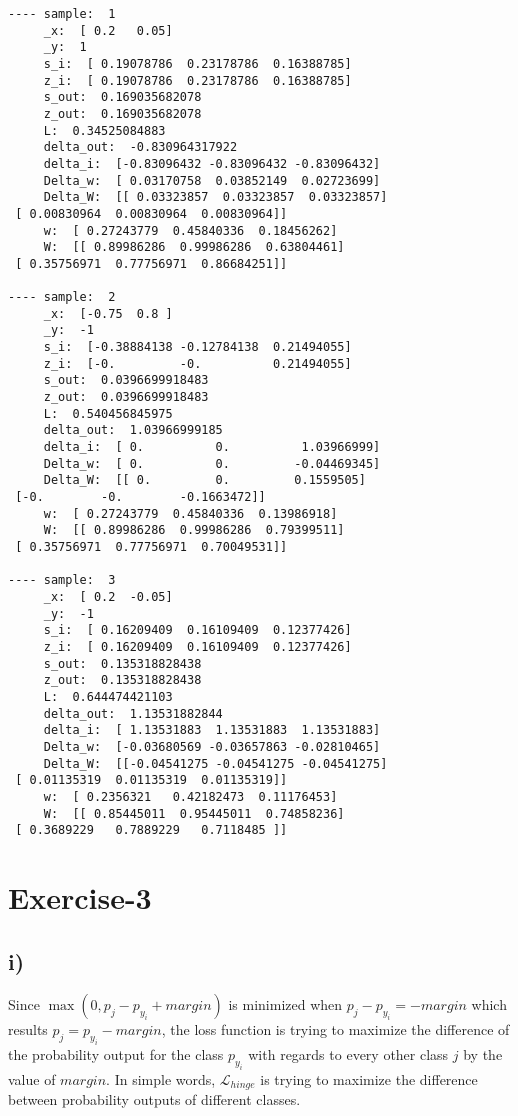 \documentclass[10pt]{article}
\begin{document}
\begin{multicols}{3}
\begin{tiny}
\begin{verbatim}
---- sample:  1
     _x:  [ 0.2   0.05]
     _y:  1
     s_i:  [ 0.19078786  0.23178786  0.16388785]
     z_i:  [ 0.19078786  0.23178786  0.16388785]
     s_out:  0.169035682078
     z_out:  0.169035682078
     L:  0.34525084883
     delta_out:  -0.830964317922
     delta_i:  [-0.83096432 -0.83096432 -0.83096432]
     Delta_w:  [ 0.03170758  0.03852149  0.02723699]
     Delta_W:  [[ 0.03323857  0.03323857  0.03323857]
 [ 0.00830964  0.00830964  0.00830964]]
     w:  [ 0.27243779  0.45840336  0.18456262]
     W:  [[ 0.89986286  0.99986286  0.63804461]
 [ 0.35756971  0.77756971  0.86684251]]

---- sample:  2
     _x:  [-0.75  0.8 ]
     _y:  -1
     s_i:  [-0.38884138 -0.12784138  0.21494055]
     z_i:  [-0.         -0.          0.21494055]
     s_out:  0.0396699918483
     z_out:  0.0396699918483
     L:  0.540456845975
     delta_out:  1.03966999185
     delta_i:  [ 0.          0.          1.03966999]
     Delta_w:  [ 0.          0.         -0.04469345]
     Delta_W:  [[ 0.         0.         0.1559505]
 [-0.        -0.        -0.1663472]]
     w:  [ 0.27243779  0.45840336  0.13986918]
     W:  [[ 0.89986286  0.99986286  0.79399511]
 [ 0.35756971  0.77756971  0.70049531]]

---- sample:  3
     _x:  [ 0.2  -0.05]
     _y:  -1
     s_i:  [ 0.16209409  0.16109409  0.12377426]
     z_i:  [ 0.16209409  0.16109409  0.12377426]
     s_out:  0.135318828438
     z_out:  0.135318828438
     L:  0.644474421103
     delta_out:  1.13531882844
     delta_i:  [ 1.13531883  1.13531883  1.13531883]
     Delta_w:  [-0.03680569 -0.03657863 -0.02810465]
     Delta_W:  [[-0.04541275 -0.04541275 -0.04541275]
 [ 0.01135319  0.01135319  0.01135319]]
     w:  [ 0.2356321   0.42182473  0.11176453]
     W:  [[ 0.85445011  0.95445011  0.74858236]
 [ 0.3689229   0.7889229   0.7118485 ]]
\end{verbatim}
\end{tiny}
\end{multicols}

\section*{Exercise-3}
\subsection*{i)}
Since $\max(0, p_j - p_{y_i} + margin)$ is minimized when $p_j - p_{y_i} = - margin$ which results $p_j = p_{y_i} - margin$, the loss function is trying to maximize the difference of the probability output for the class $p_{y_i}$ with regards to every other class $j$ by the value of $margin$.
In simple words, $\mathcal{L}_{hinge}$ is trying to maximize the difference between probability outputs of different classes.
\end{document}
